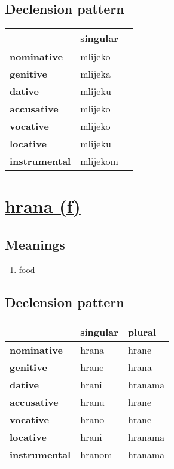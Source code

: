 \subsection*{Declension pattern}
\begin{tabularx}{\linewidth}{Xll}
\toprule
{} &  singular \\
\midrule
\textbf{nominative  } &   mlijeko \\
\textbf{genitive    } &   mlijeka \\
\textbf{dative      } &   mlijeku \\
\textbf{accusative  } &   mlijeko \\
\textbf{vocative    } &   mlijeko \\
\textbf{locative    } &   mlijeku \\
\textbf{instrumental} &  mlijekom \\
\bottomrule
\end{tabularx}

\filbreak
\section{\underline{hrana (f)}}
\subsection*{Meanings}
\begin{enumerate}
\item food
\end{enumerate}
\subsection*{Declension pattern}
\begin{tabularx}{\linewidth}{Xll}
\toprule
{} & singular &   plural \\
\midrule
\textbf{nominative  } &    hrana &    hrane \\
\textbf{genitive    } &    hrane &    hrana \\
\textbf{dative      } &    hrani &  hranama \\
\textbf{accusative  } &    hranu &    hrane \\
\textbf{vocative    } &    hrano &    hrane \\
\textbf{locative    } &    hrani &  hranama \\
\textbf{instrumental} &   hranom &  hranama \\
\bottomrule
\end{tabularx}

